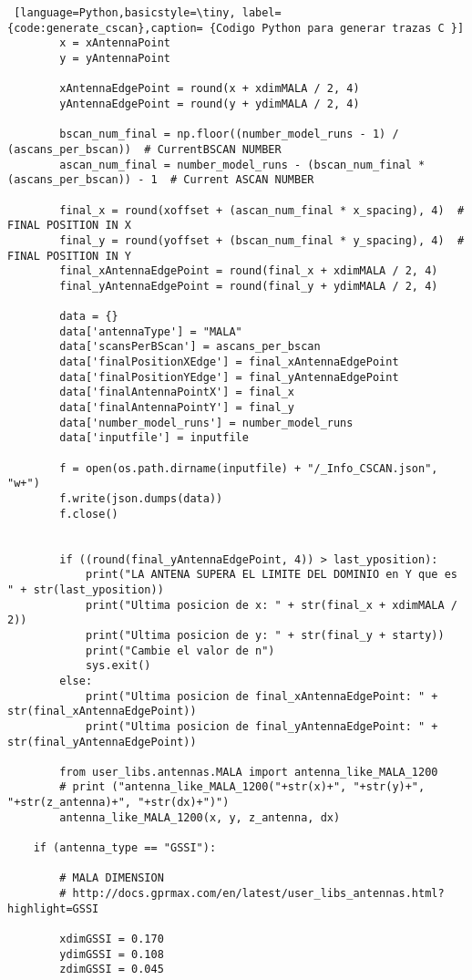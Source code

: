 \begin{lstlisting} [language=Python,basicstyle=\tiny, label={code:generate_cscan},caption= {Codigo Python para generar trazas C }]
        x = xAntennaPoint
        y = yAntennaPoint

        xAntennaEdgePoint = round(x + xdimMALA / 2, 4)
        yAntennaEdgePoint = round(y + ydimMALA / 2, 4)

        bscan_num_final = np.floor((number_model_runs - 1) / (ascans_per_bscan))  # CurrentBSCAN NUMBER
        ascan_num_final = number_model_runs - (bscan_num_final * (ascans_per_bscan)) - 1  # Current ASCAN NUMBER

        final_x = round(xoffset + (ascan_num_final * x_spacing), 4)  # FINAL POSITION IN X
        final_y = round(yoffset + (bscan_num_final * y_spacing), 4)  # FINAL POSITION IN Y
        final_xAntennaEdgePoint = round(final_x + xdimMALA / 2, 4)
        final_yAntennaEdgePoint = round(final_y + ydimMALA / 2, 4)

        data = {}
        data['antennaType'] = "MALA"
        data['scansPerBScan'] = ascans_per_bscan
        data['finalPositionXEdge'] = final_xAntennaEdgePoint
        data['finalPositionYEdge'] = final_yAntennaEdgePoint
        data['finalAntennaPointX'] = final_x
        data['finalAntennaPointY'] = final_y
        data['number_model_runs'] = number_model_runs
        data['inputfile'] = inputfile

        f = open(os.path.dirname(inputfile) + "/_Info_CSCAN.json", "w+")
        f.write(json.dumps(data))
        f.close()


        if ((round(final_yAntennaEdgePoint, 4)) > last_yposition):
            print("LA ANTENA SUPERA EL LIMITE DEL DOMINIO en Y que es " + str(last_yposition))
            print("Ultima posicion de x: " + str(final_x + xdimMALA / 2))
            print("Ultima posicion de y: " + str(final_y + starty))
            print("Cambie el valor de n")
            sys.exit()
        else:
            print("Ultima posicion de final_xAntennaEdgePoint: " + str(final_xAntennaEdgePoint))
            print("Ultima posicion de final_yAntennaEdgePoint: " + str(final_yAntennaEdgePoint))

        from user_libs.antennas.MALA import antenna_like_MALA_1200
        # print ("antenna_like_MALA_1200("+str(x)+", "+str(y)+", "+str(z_antenna)+", "+str(dx)+")")
        antenna_like_MALA_1200(x, y, z_antenna, dx)

    if (antenna_type == "GSSI"):

        # MALA DIMENSION
        # http://docs.gprmax.com/en/latest/user_libs_antennas.html?highlight=GSSI

        xdimGSSI = 0.170
        ydimGSSI = 0.108
        zdimGSSI = 0.045


\end{lstlisting}
